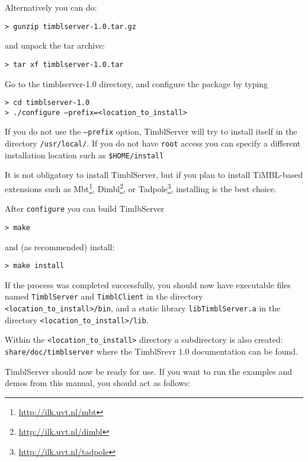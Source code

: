 \documentclass{report}
\begin{document}
Alternatively you can do:

{\tt > gunzip timblserver-1.0.tar.gz}

and unpack the tar archive:

{\tt > tar xf timblserver-1.0.tar}

Go to the timblserver-1.0 directory, and configure the package by typing

{\tt > cd timblserver-1.0} \\
{\tt > ./configure --prefix=<location\_to\_install>}

If you do not use the {\tt --prefix} option, TimblServer will try to install itself in the directory {\tt /usr/local/}.  If you do not have {\tt root} access you can specify a different installation location such as {\tt \$HOME/install}

It is not obligatory to install TimblServer, but if you plan to install TiMBL-based extensions such as Mbt\footnote{\url{http://ilk.uvt.nl/mbt}}, Dimbl\footnote{\url{http://ilk.uvt.nl/dimbl}}, or Tadpole\footnote{\url{http://ilk.uvt.nl/tadpole}}, installing is the best choice.

After {\tt configure} you can build TimlbServer

{\tt > make}

and (as recommended) install:

{\tt > make install }

If the process was completed successfully, you should now have executable files
named {\tt TimblServer} and {\tt TimblClient} in the directory 
{\tt <location\_to\_install>/bin}, and a static library {\tt libTimblServer.a} in the directory {\tt <location\_to\_install>/lib}.

Within the {\tt <location\_to\_install>} directory a subdirectory is also created: {\tt share/doc/timblserver} where the TimblSrevr 1.0 documentation can be found.

TimblServer should now be ready for use. If you want to run the examples and demos from this manual, you should act as follows:
\end{document}
